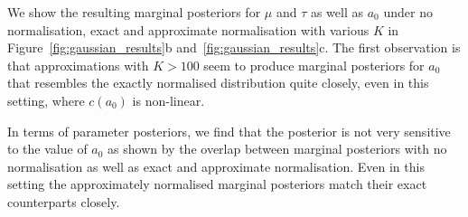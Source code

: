 \documentclass[a4paper, notitlepage, 11pt]{article}
\begin{document}
We show the resulting marginal posteriors for $\mu$ and $\tau$ as well as $a_0$ under no normalisation, exact and approximate normalisation with various $K$ in Figure~\ref{fig:gaussian_results}b and~\ref{fig:gaussian_results}c.
The first observation is that approximations with $K > 100$ seem to produce marginal posteriors for $a_0$ that resembles the exactly normalised distribution quite closely, even in this setting, where $c(a_0)$ is non-linear.

In terms of parameter posteriors, we find that the posterior is not very sensitive to the value of $a_0$ as shown by the overlap between marginal posteriors with no normalisation as well as exact and approximate normalisation.
Even in this setting the approximately normalised marginal posteriors match their exact counterparts closely.
\end{document}
